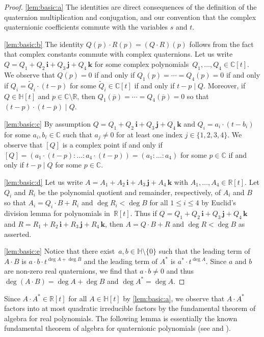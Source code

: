 \documentclass[11pt]{article}
\newcommand{\RL}[2]{\Cref{lem:#1}\ref{lem:#1:#2}}
\newcommand{\C}{\mathbb{C}}
\newcommand{\R}{\mathbb{R}}
\renewcommand{\H}{\mathbb{H}}
\newcommand{\tQ}{\tilde{Q}}
\newcommand{\op}{{\overline{p}}}
\newcommand{\qi}{\mathbf{i}}
\newcommand{\qj}{\mathbf{j}}
\newcommand{\qk}{\mathbf{k}}
\newcommand{\resp}{respectively}
\newcommand{\st}{such that }
\begin{document}
\begin{proof}
\ref{lem:basic:a}
The identities are direct consequences of the definition
of the quaternion multiplication and conjugation, and our convention that
the complex quaternionic coefficients commute with the variables $s$ and $t$.

\ref{lem:basic:b}
The identity $Q(p)\cdot R(p)=(Q\cdot R)(p)$ follows from the fact that
complex constants commute with complex quaternions.
Let us write $Q=Q_1+Q_2\,\qi+Q_3\,\qj+Q_4\,\qk$
for some complex polynomials~$Q_1,\ldots,Q_4\in\C[t]$.
We observe that $Q(p)=0$
if and only if
$Q_1(p)=\cdots=Q_4(p)=0$
if and only if
$Q_i=\tQ_i\cdot(t-p)$ for some $\tQ_i\in\C[t]$
if and only if
$t-p\mid Q$.
Moreover, if $Q \in \H[t]$ and $p \in \C \setminus \R$,
then $Q_1(\op)=\cdots=Q_4(\op)=0$ so that $(t-p)\cdot(t-\op)\mid Q$.

\ref{lem:basic:c}
By assumption
$Q=Q_1+Q_2\,\qi+Q_3\,\qj+Q_4\,\qk$
and
$Q_i=a_i\cdot (t-b_i)$ for some $a_i,b_i\in\C$ \st $a_j\neq 0$
for at least one index $j\in\{1,2,3,4\}$.
We observe that
$[Q]$ is a complex point
if and only if
$[Q]=(a_1\cdot (t-p):\ldots:a_4\cdot (t-p))=(a_1:\ldots:a_4)$ for some $p\in \C$
if and only if
$t-p\mid Q$ for some $p\in \C$.

\ref{lem:basic:d}
Let us write $A=A_1+A_2\,\qi+A_3\,\qj+A_4\,\qk$ with $A_1,\ldots,A_4\in\R[t]$.
Let $Q_i$ and $R_i$ be the polynomial quotient and remainder, \resp,
of $A_i$ and $B$
so that $A_i=Q_i\cdot B+R_i$ and $\deg R_i<\deg B$
for all $1\leq i\leq 4$
by Euclid's division lemma for polynomials in~$\R[t]$.
Thus if
$Q=Q_1+Q_2\,\qi+Q_3\,\qj+Q_4\,\qk$ and
$R=R_1+R_2\,\qi+R_3\,\qj+R_4\,\qk$,
then $A=Q\cdot B+R$ and $\deg R<\deg B$ as asserted.

\ref{lem:basic:e}
Notice that there exist~$a,b\in\H\setminus\{0\}$
\st the leading term of $A\cdot B$ is $a\cdot b\cdot t^{\deg A+\deg B}$
and the leading term of $A^*$ is $a^*\cdot t^{\deg A}$.
Since $a$ and $b$ are non-zero real quaternions,
we find that $a\cdot b\neq 0$ and thus $\deg(A\cdot B)=\deg A+\deg B$ and $\deg A^*=\deg A$.
\end{proof}

Since $A\cdot A^*\in\R[t]$ for all $A\in\H[t]$ by \RL{basic}{a},
we observe that $A\cdot A^*$ factors into at most quadratic irreducible factors
by the fundamental theorem of algebra for real polynomials.
The following lemma is essentially the known fundamental theorem of algebra for quaternionic
polynomials (see \cite{1966} and \citep[Theorem~5.2]{2008}).
\end{document}
